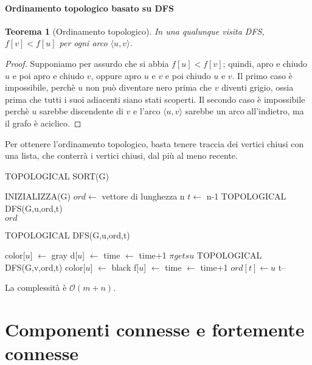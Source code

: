 \documentclass[11pt]{book}
\newtheorem*{theorem}{Teorema}
\begin{document}
\subsubsection{Ordinamento topologico basato su DFS}
\begin{theorem}[Ordinamento topologico]
    In una qualunque visita DFS, $f[v]<f[u]$ per ogni arco $\langle u,v \rangle$.
\end{theorem}
\begin{proof}
    Supponiamo per assurdo che si abbia $f[u]<f[v]$; quindi, apro e chiudo $u$ e poi apro e chiudo $v$, oppure apro $u$ 
    e $v$ e poi chiudo $u$ e $v$. Il primo caso è impossibile, perchè $u$ non può diventare nero prima che $v$ diventi 
    grigio, ossia prima che tutti i suoi adiacenti siano stati scoperti. Il secondo caso è impossibile perchè $u$ sarebbe 
    discendente di $v$ e l'arco $\langle u,v \rangle$ sarebbe un arco all'indietro, ma il grafo è aciclico.
\end{proof}
Per ottenere l'ordinamento topologico, basta tenere traccia dei vertici chiusi con una lista, che conterrà i vertici chiusi, 
dal più al meno recente.
\begin{algorithm}[H]
    \caption{TOPOLOGICAL SORT(G)}
    \begin{algorithmic}
        \State INIZIALIZZA(G)
        \State $ord \gets$ vettore di lunghezza n 
        \State $t \gets$ n-1
                \State TOPOLOGICAL DFS(G,u,ord,t)
            \EndIf
        \EndFor\\
        \Return $ord$
    \end{algorithmic}
\end{algorithm}
\begin{algorithm}[H]
    \caption{TOPOLOGICAL DFS(G,u,ord,t)}
    \begin{algorithmic}
        \State color[$u$] $\gets$ gray 
        \State d[$u$] $\gets$ time $\gets$ time+1
                \State $\pi gets u$
                \State TOPOLOGICAL DFS(G,v,ord,t)
            \EndIf 
        \EndFor 
        \State color[$u$] $\gets$ black 
        \State f[$u$] $\gets$ time $\gets$ time+1
        \State $ord[t] \gets u$
        \State t--
    \end{algorithmic}
\end{algorithm}
La complessità è $\mathcal{O}(m+n)$.
\chapter{Componenti connesse e fortemente connesse}
\end{document}
